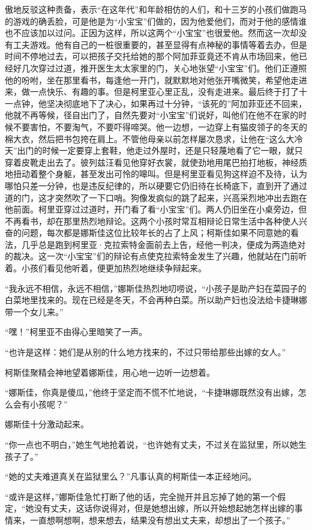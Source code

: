 傲地反驳这种责备，表示“在这年代”和年龄相仿的人们，和十三岁的小孩们做跑马的游戏的确丢脸，可是他是为“小宝宝”们做的，因为他爱他们，而对于他的感情谁也不应该加以过问。正因为这样，所以这两个“小宝宝”也很爱他。然而这一次却没有工夫游戏。他有自己的一桩很重要的，甚至显得有点神秘的事情等着去办，但是时间不停地过去，可以把孩子交托给她的那个阿加菲亚竟还不肯从市场回来，他已经好几次穿过过道，推开医生太太家里的门，关心地张望“小宝宝”们。他们正遵照他的吩咐，坐在那里看书，每逢他一开门，就默默地对他张开嘴微笑，希望他走进来，做一点快乐、有趣的事。但是柯里亚心里正乱，没有走进来。最后终于打了十一点钟，他坚决彻底地下了决心，如果再过十分钟，“该死的”阿加菲亚还不回来，他就不再等候，径自出门了，自然先要对“小宝宝”们说好，叫他们在他不在家的时候不要害怕，不要淘气，不要吓得啼哭。他一边想，一边穿上有猫皮领子的冬天的棉大衣，然后把书包挎在肩上。不管他母亲以前怎样屡次恳求，让他在“这么大冷天”出门的时候一定要穿上套鞋，他走过外屋时，还是只轻蔑地看了它一眼，就只穿着皮靴走出去了。彼列兹汪看见他穿好衣裳，就使劲地用尾巴拍打地板，神经质地扭动着整个身躯，甚至发出可怜的嗥叫。但是柯里亚看见狗这样迫不及待，认为哪怕只差一分钟，也是违反纪律的，所以硬要它仍旧待在长椅底下，直到开了通过道的门，这才突然吹了一下口哨。狗像发疯似的跳了起来，兴高采烈地冲出去跑在他前面。柯里亚穿过过道时，开门看了看“小宝宝”们。两人仍旧坐在小桌旁边，但不再看书，却在那里热烈地辩论。这两个小孩时常互相辩论日常生活中各种使人兴奋的问题，每次都是娜斯佳这位比较年长的占了上风；柯斯佳如果不同意她的看法，几乎总是跑到柯里亚·克拉索特金面前去上告，经他一判决，便成为两造绝对的裁决。这一次“小宝宝”们的辩论有点使克拉索特金发生了兴趣，他就站在门前听着。小孩们看见他听着，便更加热烈地继续争辩起来。
\par “我永远不相信，永远不相信，”娜斯佳热烈地叨唠说，“小孩子是助产妇在菜园子的白菜地里找来的。现在已经是冬天，不会再种白菜。所以助产妇也没法给卡捷琳娜带一个女儿来。”
\par “嘿！”柯里亚不由得心里暗笑了一声。
\par “也许是这样：她们是从别的什么地方找来的，不过只带给那些出嫁的女人。”
\par 柯斯佳聚精会神地望着娜斯佳，用心地一边听一边想着。
\par “娜斯佳，你真是傻瓜，”他终于坚定而不慌不忙地说，“卡捷琳娜既然没有出嫁，怎么会有小孩呢？”
\par 娜斯佳十分激动起来。
\par “你一点也不明白，”她生气地抢着说，“也许她有丈夫，不过关在监狱里，所以她生孩子了。”
\par “她的丈夫难道真关在监狱里么？”凡事认真的柯斯佳一本正经地问。
\par “或许是这样，”娜斯佳急忙打断了他的话，完全抛开并且忘掉了她的第一个假定，“她没有丈夫，这话你说得对，但是她想出嫁，所以开始想起她怎样出嫁的事情来，一直想啊想啊，想来想去，结果没有想出丈夫来，却想出了一个孩子。”
